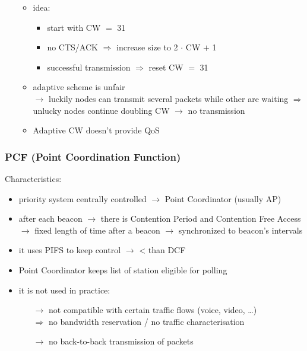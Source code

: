\begin{itemize}
\begin{itemize}
        \item[] \begin{itemize}
            \item idea:
            \begin{itemize}
                \item start with CW $=$ 31
                \item no CTS/ACK $\Rightarrow$ increase size to 2 $\cdot$ CW $+$ 1
                \item successful transmission $\Rightarrow$ reset CW $=$ 31
            \end{itemize}
            \item adaptive scheme is unfair\\[0.15cm]
            $\rightarrow$ luckily nodes can transmit several packets while other are waiting
            $\Rightarrow$ unlucky nodes continue doubling CW $\rightarrow$ no transmission
            \item Adaptive CW doesn't provide QoS
        \end{itemize}
    \end{itemize}
\end{itemize}
\subsubsection{PCF (Point Coordination Function)}
Characteristics:
\begin{itemize}
    \item priority system centrally controlled $\rightarrow$ Point Coordinator (usually AP)
    \item after each beacon $\rightarrow$ there is Contention Period and Contention Free Access\\[0.15cm]
    $\rightarrow$ fixed length of time after a beacon $\rightarrow$ synchronized to beacon's intervals
    \item it uses PIFS to keep control $\rightarrow$ < than DCF
    \item Point Coordinator keeps list of station eligible for polling
    \item it is not used in practice:
    \begin{itemize}
        \item[$\rightarrow$] not compatible with certain traffic flows (voice, video, \dots)\\[0.15cm]
        $\Rightarrow$ no bandwidth reservation / no traffic characterisation
        \item[$\rightarrow$] no back-to-back transmission of packets
    \end{itemize}
\end{itemize}
